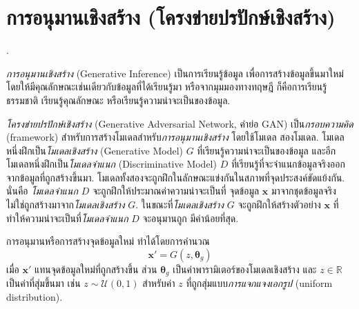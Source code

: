 

\section{การอนุมานเชิงสร้าง (โครงข่ายปรปักษ์เชิงสร้าง)}.

\textit{การอนุมานเชิงสร้าง} (Generative Inference) เป็นการเรียนรู้ข้อมูล เพื่อการสร้างข้อมูลขึ้นมาใหม่ โดยให้มีคุณลักษณะเช่นเดียวกับข้อมูลที่ได้เรียนรู้มา
หรือจากมุมมองทางทฤษฎี ก็คือการเรียนรู้ธรรมชาติ เรียนรู้คุณลักษณะ
หรือเรียนรู้ความน่าจะเป็นของข้อมูล.

\textit{โครงข่ายปรปักษ์เชิงสร้าง} (Generative Adversarial Network, คำย่อ GAN\cite{GPaMXWfOCB2014})
เป็น\textit{กรอบความคิด} (framework) สำหรับการสร้างโมเดลสำหรับ\textit{การอนุมานเชิงสร้าง} โดยใช้โมเดล สองโมเดล.
โมเดลหนึ่งฝึกเป็น\textit{โมเดลเชิงสร้าง} (Generative Model) $G$ 
ที่เรียนรู้ความน่าจะเป็นของข้อมูล
และอีกโมเดลหนึ่งฝึกเป็น\textit{โมเดลจำแนก} (Discriminative Model) $D$ ที่เรียนรู้ที่จะจำแนกข้อมูลจริงออกจากข้อมูลที่ถูกสร้างขึ้นมา.
โมเดลทั้งสองจะถูกฝึกในลักษณะแข่งกันในสภาพที่จุดประสงค์ขัดแย้งกัน.
นั่นคือ \textit{โมเดลจำแนก} $D$ จะถูกฝึกให้ประมาณค่าความน่าจะเป็นที่
จุดข้อมูล $\bm{x}$ มาจากชุดข้อมูลจริง ไม่ใช่ถูกสร้างมาจาก\textit{โมเดลเชิงสร้าง} $G$.
ในขณะที่\textit{โมเดลเชิงสร้าง} $G$ จะถูกฝึกให้สร้างตัวอย่าง $\bm{x}$ ที่ทำให้ความน่าจะเป็นที่\textit{โมเดลจำแนก} $D$ จะอนุมานถูก มีค่าน้อยที่สุด.

การอนุมานหรือการสร้างจุดข้อมูลใหม่ ทำได้โดยการคำนวณ
\begin{equation}
\bm{x}' = G(z, \bm{\theta}_g)
\label{eq: opt GAN generation}
\end{equation}
เมื่อ $\bm{x}'$ แทนจุดข้อมูลใหม่ที่ถูกสร้างขึ้น
ส่วน $\bm{\theta}_g$ เป็นค่าพารามิเตอร์ของโมเดลเชิงสร้าง
และ $z \in \mathbb{R}$ เป็นค่าที่สุ่มขึ้นมา เช่น $z \sim \mathcal{U}(0,1)$ สำหรับค่า $z$ ที่ถูกสุ่มแบบ\textit{การแจกแจงเอกรูป} (uniform distribution).

